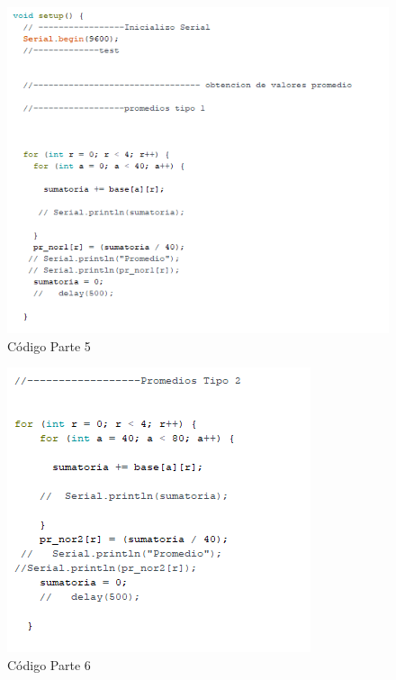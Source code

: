 \documentclass[10pt,a4paper]{article}
\begin{document}
\begin{figure}[H]
\caption{Código Parte 5}
\centering
\includegraphics[scale=0.9]{c5.png}
\end{figure}

\begin{figure}[H]
\caption{Código Parte 6}
\centering
\includegraphics[scale=0.9]{c6.png}
\end{figure}
\end{document}
